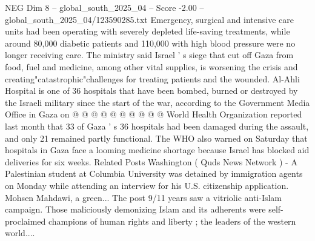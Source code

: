 \begin{textsample}{NEG Dim 8 – global\_south\_2025\_04 – Score -2.00 – global\_south\_2025\_04/123590285.txt}
Emergency, surgical and intensive care units had been operating with severely depleted life-saving treatments, while around 80,000 diabetic patients and 110,000 with high blood pressure were no longer receiving care.
The ministry said Israel ' s siege that cut off Gaza from food, fuel and medicine, among other vital supplies, is worsening the crisis and creating"catastrophic"challenges for treating patients and the wounded.
Al-Ahli Hospital is one of 36 hospitals that have been bombed, burned or destroyed by the Israeli military since the start of the war, according to the Government Media Office in Gaza on @ @ @ @ @ @ @ @ @ @ World Health Organization reported last month that 33 of Gaza ' s 36 hospitals had been damaged during the assault, and only 21 remained partly functional.
The WHO also warned on Saturday that hospitals in Gaza face a looming medicine shortage because Israel has blocked aid deliveries for six weeks.
Related Posts Washington ( Quds News Network ) - A Palestinian student at Columbia University was detained by immigration agents on Monday while attending an interview for his U.S. citizenship application.
Mohsen Mahdawi, a green...
The post 9/11 years saw a vitriolic anti-Islam campaign.
Those maliciously demonizing Islam and its adherents were self-proclaimed champions of human rights and liberty ; the leaders of the western world....

\end{textsample}
